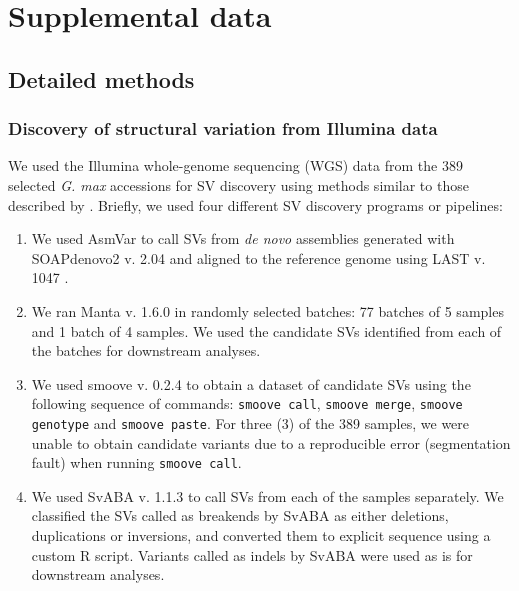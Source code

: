 \chapter*{Supplemental data}
\label{supdata}

\renewcommand\thefigure{S\arabic{figure}} 
\setcounter{figure}{0}
\setcounter{table}{0}
\renewcommand\thetable{S\arabic{table}} 

\newcommand{\getvar}[1]{\DTLfetch{variables}{key}{#1}{value}}

\section*{Detailed methods}
\label{annexe-sv-gwas-detailed-methods}

\subsection*{Discovery of structural variation from Illumina data}
\label{sv-gwas-sv-discovery-illumina}

We used the Illumina whole-genome sequencing (WGS) data from the 389 selected \emph{G. max} accessions
for SV discovery using methods similar to those described by
\cite{lemay2022}.  Briefly, we used four different SV discovery programs or
pipelines: 

\begin{enumerate}

\item We used AsmVar \citep[version of 2015-04-16, ][]{liu2015} to call SVs
	from \emph{de novo} assemblies generated with SOAPdenovo2 v. 2.04
		\citep{luo2012} and aligned to the reference genome using LAST
		v. 1047 \citep{kielbasa2011}.
\item We ran Manta v. 1.6.0 \citep{chen2016} in randomly selected batches: 77 batches of
	5 samples and 1 batch of 4 samples. We used the candidate SVs
		identified from each of the batches for downstream analyses.
\item We used smoove v. 0.2.4 \citep{pedersen2019} to obtain a dataset of candidate SVs
	using the following sequence of commands:
	\texttt{smoove call}, \texttt{smoove merge}, \texttt{smoove
		genotype} and \texttt{smoove paste}.
		For three (3) of the 389 samples, we were unable
		to obtain candidate variants due to a reproducible
		error (segmentation fault) when running \texttt{smoove
		call}.
	\item We used SvABA v. 1.1.3 \citep{wala2018} to call SVs from each of the
	samples separately. We classified the SVs called as breakends by SvABA
		as either deletions, duplications or inversions, and converted
		them to explicit sequence using a custom R script. Variants
		called as indels by SvABA were used as is for downstream
		analyses.
\end{enumerate}

